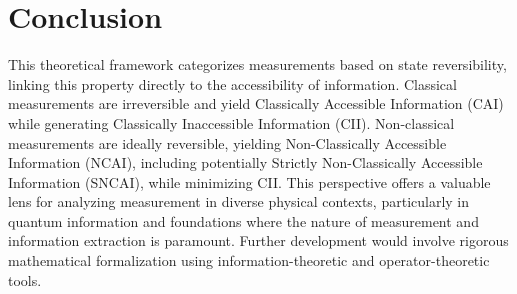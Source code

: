 \documentclass[11pt, a4paper]{article}
\theoremstyle{plain} %
\theoremstyle{definition} %
\theoremstyle{remark} %
\begin{document}
	
	\section{Conclusion}
	
	This theoretical framework categorizes measurements based on state reversibility, linking this property directly to the accessibility of information. Classical measurements are irreversible and yield Classically Accessible Information (CAI) while generating Classically Inaccessible Information (CII). Non-classical measurements are ideally reversible, yielding Non-Classically Accessible Information (NCAI), including potentially Strictly Non-Classically Accessible Information (SNCAI), while minimizing CII. This perspective offers a valuable lens for analyzing measurement in diverse physical contexts, particularly in quantum information and foundations where the nature of measurement and information extraction is paramount. Further development would involve rigorous mathematical formalization using information-theoretic and operator-theoretic tools.
	
	
	
\end{document}
